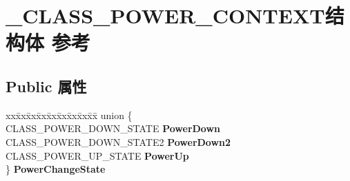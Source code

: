 \hypertarget{struct___c_l_a_s_s___p_o_w_e_r___c_o_n_t_e_x_t}{}\section{\+\_\+\+C\+L\+A\+S\+S\+\_\+\+P\+O\+W\+E\+R\+\_\+\+C\+O\+N\+T\+E\+X\+T结构体 参考}
\label{struct___c_l_a_s_s___p_o_w_e_r___c_o_n_t_e_x_t}
\subsection*{Public 属性}
\begin{DoxyCompactItemize}
\item 
\mbox{\label{struct___c_l_a_s_s___p_o_w_e_r___c_o_n_t_e_x_t_ae656952974bc3396b12e846176a375b5}} 
\begin{tabbing}
xx\=xx\=xx\=xx\=xx\=xx\=xx\=xx\=xx\=\kill
union \{\\
\>CLASS\_POWER\_DOWN\_STATE {\bfseries PowerDown}\\
\>CLASS\_POWER\_DOWN\_STATE2 {\bfseries PowerDown2}\\
\>CLASS\_POWER\_UP\_STATE {\bfseries PowerUp}\\
\} {\bfseries PowerChangeState}\\


\end{tabbing}
\end{DoxyCompactItemize}
